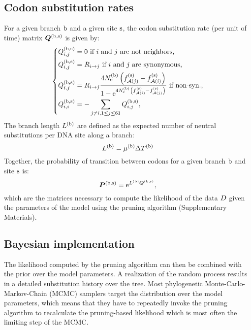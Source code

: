 \subsection{Codon {substitution} rates}
For a given branch $\text{b}$ and a given site $\text{s}$, the \gls{codon} \gls{substitution} rate (per unit of time) matrix $\bm{Q}^{(\text{b}, \text{s})}$ is given by:
\begin{equation}
\label{eq:subrates}
\begin{dcases}
\submatrix\branchsiteexp_{\itoj} = 0\text{ if $\ci$ and $\cj$ are not neighbors,} \\
\submatrix\branchsiteexp_{\itoj} = \mutmatrix_{\nucitoj}\text{ if $\ci$ and $\cj$ are synonymous,} \\
\submatrix\branchsiteexp_{\itoj} = \mutmatrix_{\nucitoj} \dfrac{4\Ne\branchexp \left({\fitj\siteexp - \fiti\siteexp}\right)}{{1 - \e^{4\Ne\branchexp\left({\fiti\siteexp - \fitj\siteexp}\right)} }} \text{ if non-syn.,}\\
\submatrix\branchsiteexp_{\ci, \ci} = - \sum\limits_{ \cj \neq \ci, \jSetCodon} \submatrix\branchsiteexp_{\itoj},
\end{dcases}
\end{equation}
The branch length $L^{(\text{b})}$ are defined as the expected number of \gls{neutral} \glspl{substitution} per \acrshort{DNA} site along a branch:
\begin{equation}
\label{eq:branchlength}
\branchlength\branchexp = \mu\branchexp \branchtime\branchexp
\end{equation}
Together, the probability of {transition} between \glspl{codon} for a given branch $\text{b}$ and site $\text{s}$ is:
\begin{equation}
\label{eq:Probmatrix}
\Probmatrix\branchsiteexp = \e^{\branchlength\branchexp \Submatrix\branchsiteexp},
\end{equation}
which are the matrices necessary to compute the \gls{likelihood} of the data $D$ given the parameters of the model using the pruning algorithm (Supplementary Materials).

\subsection{Bayesian implementation}
\label{sec:Bayesian}
The \gls{likelihood} computed by the pruning algorithm can then be combined with the \gls{prior} over the model parameters.
A realization of the random process results in a detailed \gls{substitution} history over the tree.
Most phylogenetic Monte-Carlo-Markov-Chain (\acrshort{MCMC}) samplers target the distribution over the model parameters, which means that they have to repeatedly invoke the pruning algorithm to recalculate
the pruning-based \gls{likelihood} which is most often the limiting step of the \acrshort{MCMC}.

